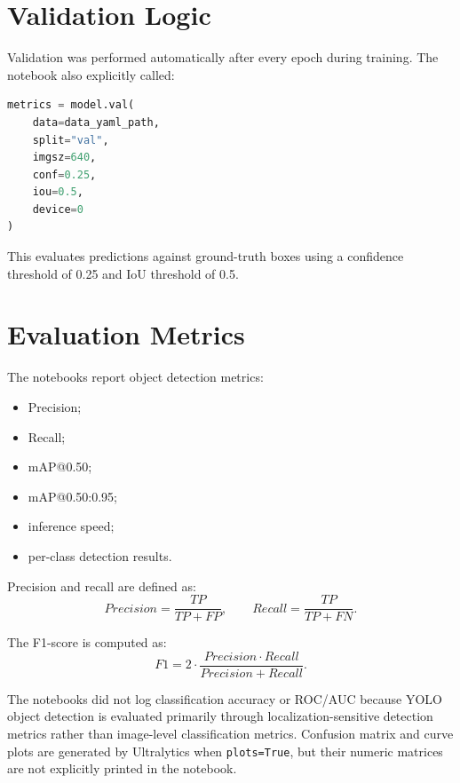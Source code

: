 \documentclass[12pt,a4paper]{article}
\begin{document}
\section{Validation Logic}

Validation was performed automatically after every epoch during training. The notebook also explicitly called:
\begin{lstlisting}[language=Python]
metrics = model.val(
    data=data_yaml_path,
    split="val",
    imgsz=640,
    conf=0.25,
    iou=0.5,
    device=0
)
\end{lstlisting}

This evaluates predictions against ground-truth boxes using a confidence threshold of 0.25 and IoU threshold of 0.5.

\section{Evaluation Metrics}

The notebooks report object detection metrics:
\begin{itemize}[noitemsep]
    \item Precision;
    \item Recall;
    \item mAP@0.50;
    \item mAP@0.50:0.95;
    \item inference speed;
    \item per-class detection results.
\end{itemize}

Precision and recall are defined as:
\[
Precision=\frac{TP}{TP+FP},
\qquad
Recall=\frac{TP}{TP+FN}.
\]

The F1-score is computed as:
\[
F1 = 2\cdot\frac{Precision\cdot Recall}{Precision+Recall}.
\]

The notebooks did not log classification accuracy or ROC/AUC because YOLO object detection is evaluated primarily through localization-sensitive detection metrics rather than image-level classification metrics. Confusion matrix and curve plots are generated by Ultralytics when \texttt{plots=True}, but their numeric matrices are not explicitly printed in the notebook.

\end{document}
